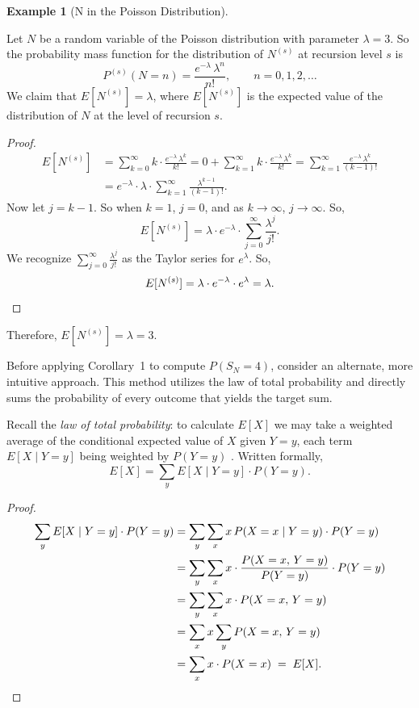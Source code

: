 \documentclass[11pt]{amsart}
\theoremstyle{definition}
\newtheorem{example}{Example}
\theoremstyle{plain}
\begin{document}
\begin{example}[N in the Poisson Distribution]\label{ex:poisson}
Let $N$ be a random variable of the Poisson distribution with parameter $\lambda = 3$.
So the probability mass function for the distribution of $N^{(s)}$ at recursion level $s$ is
\[
    P^{(s)}(N = n) = \frac{e^{-\lambda}\,\lambda^n}{n!}, \qquad n = 0, 1, 2, \ldots
\]
We claim that $E[N^{(s)}] = \lambda$, where $E[N^{(s)}]$ is the expected value of the
distribution of $N$ at the level of recursion $s$.

\begin{proof}
\begin{align*}
E[N^{(s)}]
    &= \sum_{k=0}^{\infty} k \cdot \frac{e^{-\lambda}\,\lambda^k}{k!}
     = 0 + \sum_{k=1}^{\infty} k \cdot \frac{e^{-\lambda}\,\lambda^k}{k!}
     = \sum_{k=1}^{\infty} \frac{e^{-\lambda}\,\lambda^k}{(k-1)!} \\
    &= e^{-\lambda} \cdot \lambda \cdot \sum_{k=1}^{\infty} \frac{\lambda^{k-1}}{(k-1)!}.
\end{align*}
Now let $j = k - 1$.  So when $k = 1$, $j = 0$, and as $k \to \infty$, $j \to \infty$.
So,
\[
    E[N^{(s)}] = \lambda \cdot e^{-\lambda} \cdot \sum_{j=0}^{\infty} \frac{\lambda^j}{j!}.
\]
We recognize $\sum_{j=0}^{\infty} \tfrac{\lambda^j}{j!}$ as the Taylor series for $e^\lambda$.
So,
\[
    E[N^{(s)}] = \lambda \cdot e^{-\lambda} \cdot e^{\lambda} = \lambda. \qedhere
\]
\end{proof}

Therefore, $E[N^{(s)}] = \lambda = 3$. 

Before applying Corollary~1 to compute $P(S_N = 4)$, consider an alternate,
more intuitive approach.  This method utilizes the law of total probability
and directly sums the probability of every outcome that yields the target sum.

Recall the \emph{law of total probability}: to calculate $E[X]$ we may take
a weighted average of the conditional expected value of $X$ given $Y = y$,
each term $E[X \mid Y = y]$ being weighted by $P(Y = y)$ \cite[p.~107]{ross2010}.  Written formally,
\[
    E[X] = \sum_{y} E[X \mid Y = y] \cdot P(Y = y).
\]

\begin{proof}
\begin{align*}
\sum_{y} E[X \mid Y = y] \cdot P(Y = y)
    &= \sum_{y}\sum_{x} x\,P(X = x \mid Y = y) \cdot P(Y = y) \\
    &= \sum_{y}\sum_{x} x \cdot \frac{P(X = x,\,Y = y)}{P(Y = y)} \cdot P(Y = y) \\
    &= \sum_{y}\sum_{x} x \cdot P(X = x,\,Y = y) \\
    &= \sum_{x} x \sum_{y} P(X = x,\,Y = y) \\
    &= \sum_{x} x \cdot P(X = x) \;=\; E[X]. \qedhere
\end{align*}
\end{proof}


\end{example}
\end{document}
